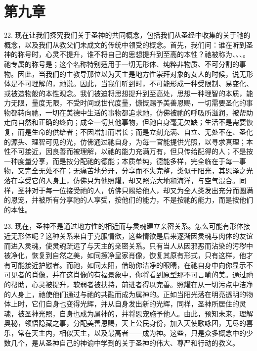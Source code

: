 
\section{第九章}

\par

22. 现在让我们探究我们关于圣神的共同概念，包括我们从圣经中收集的关于祂的概念，以及我们从教父们未成文的传统中领受的概念。首先，我们问：谁在听到圣神的称号时，心灵不提升，谁不将自己的思想提升到至高的本性？祂被称为、、、。祂专属的称号是；这个名称特别适用于一切无形体、纯粹非物质、不可分割的事物。因此，当我们的主教导那位以为天主是地方性崇拜对象的女人的时候，说无形体是不可理解的，祂说。因此，当我们听到时，不可能形成一种受限制、易变化、或被造物般的本性观念。我们被迫将思想提升到至高处，思想一种理智的本质，能力无限，量度无限，不受时间或世代度量，慷慨赐予美善恩赐，一切需要圣化的事物都转向祂，一切在美德中生活的事物都追求祂，仿佛被祂的呼吸所滋润，被帮助走向自然和正确的终向；成全一切其他事物，但祂自身毫无欠缺；生活不是需要恢复，而是生命的供给者；不因增加而增长；而是立刻充满、自立、无处不在、圣化的源头、理智可见的光，仿佛通过祂自身，为每一官能提供光照，以寻求真理；本性不可接近，因良善而被理解，以祂的能力充满万有，但只传给配得的人；不是按一种度量分享，而是按分配祂的德能；本质单纯，德能多样，完全临在于每一事物，又完全无处不在；无痛苦地分开，分享而不失完整，类似于阳光，其恩泽之光落在享受它的人身上，仿佛只为他照耀，却又照亮大地和海洋，与空气混合。同样，圣神对于每一位接受祂的人，仿佛只赐给他人，却又为全人类发出充分而圆满的恩宠，并被所有分享祂的人享受，按他们的能力，不是按祂的能力，而是按他们的本性。\par

23. 现在，圣神不是通过地方性的相近而与灵魂建立亲密关系。怎么可能有形体接近无形体呢？这种关系来自于克服情欲，这些情欲是后来逐渐因灵魂与肉体的友谊而进入灵魂，使灵魂疏远了与天主的亲密关系。只有当人从因邪恶而沾染的污秽中被净化，恢复到自然之美，如同擦净皇家肖像，恢复其原有形式，只有这样，他才有可能接近护慰者。而祂，如同太阳，借助你洁净的眼睛，在祂自身中向你显示不可见者的肖像，并在这肖像的有福景象中，你将看到原型那不可言喻的美。通过祂的帮助，心灵被提升，软弱者被扶持，前进者得以完善。照耀在从一切污点中洁净的人身上，祂使他们通过与祂的共融而成为属神的。正如当阳光落在明亮透明的物体上时，它们自身也变得光辉，并从自身发出新的光辉，同样，圣神所居住的灵魂，被圣神光照，自身也成为属神的，并将恩宠施予他人。由此，预知未来，理解奥秘，领悟隐藏之事，分配美善恩赐，天上公民身份，加入天使歌咏团，无尽的喜乐，常在天主内，相似天主，以及最高者——成为神。这些，只是众多概念中的少数几个，是从圣神自己的神谕中学到的关于圣神的伟大、尊严和行动的教义。\par

